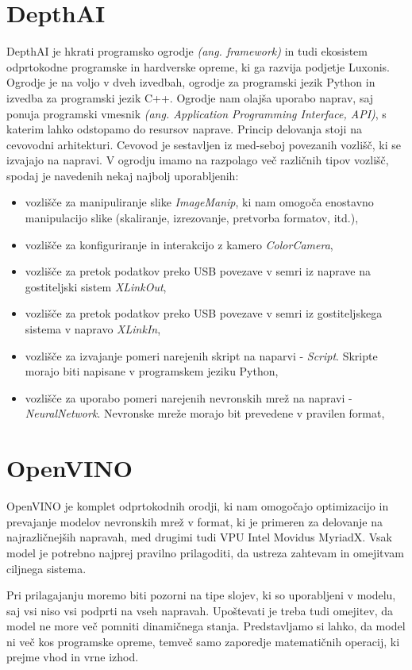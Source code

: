 \documentclass[a4paper,12pt,openright]{book}
\begin{document}
\section{DepthAI}
DepthAI je hkrati programsko ogrodje \emph{(ang. framework)} in tudi ekosistem odprtokodne programske in hardverske opreme, ki ga razvija podjetje Luxonis. Ogrodje je na voljo v dveh izvedbah, ogrodje za programski jezik Python in izvedba za programski jezik C++. Ogrodje nam olajša uporabo naprav, saj ponuja programski vmesnik \emph{(ang. Application Programming Interface, API)}, s katerim lahko odstopamo do resursov naprave. Princip delovanja stoji na cevovodni arhitekturi. Cevovod je sestavljen iz med-seboj povezanih vozlišč, ki se izvajajo na napravi. V ogrodju imamo na razpolago več različnih tipov vozlišč, spodaj je navedenih nekaj najbolj uporabljenih:
\begin{itemize}
    \item vozlišče za manipuliranje slike \emph{ImageManip}, ki nam omogoča enostavno manipulacijo slike (skaliranje, izrezovanje, pretvorba formatov, itd.),
    \item vozlišče za konfiguriranje in interakcijo z kamero \emph{ColorCamera},
    \item vozlišče za pretok podatkov preko USB povezave v semri iz naprave na gostiteljski sistem \emph{XLinkOut},
    \item vozlišče za pretok podatkov preko USB povezave v semri iz gostiteljskega sistema v napravo \emph{XLinkIn},
    \item vozlišče za izvajanje pomeri narejenih skript na naparvi - \emph{Script}. Skripte morajo biti napisane v programskem jeziku Python,
    \item vozlišče za uporabo pomeri narejenih nevronskih mrež na napravi - \emph{NeuralNetwork}. Nevronske mreže morajo bit prevedene v pravilen format,
\end{itemize}

\section{OpenVINO}
OpenVINO je komplet odprtokodnih orodji, ki nam omogočajo optimizacijo in prevajanje modelov nevronskih mrež v format, ki je primeren za delovanje na najrazličnejših napravah, med drugimi tudi VPU Intel Movidus MyriadX. Vsak model je potrebno najprej pravilno prilagoditi, da ustreza zahtevam in omejitvam ciljnega sistema.

Pri prilagajanju moremo biti pozorni na tipe slojev, ki so uporabljeni v modelu, saj vsi niso vsi podprti na vseh napravah. Upoštevati je treba tudi omejitev, da model ne more več pomniti dinamičnega stanja. Predstavljamo si lahko, da model ni več kos programske opreme, temveč samo zaporedje matematičnih operacij, ki prejme vhod in vrne izhod.
\end{document}
